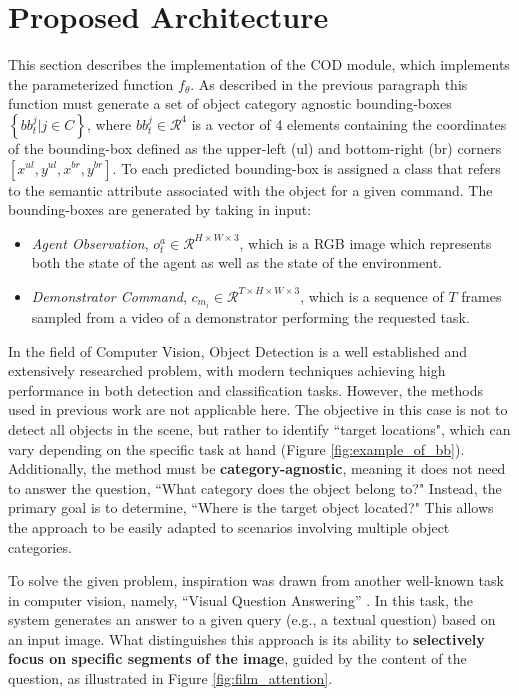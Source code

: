 \section{Proposed Architecture}
\label{sec:cod_architecture}
This section describes the implementation of the COD module, which implements the parameterized function $f_{\theta}$. 
\newline 
As described in the previous paragraph this function must generate a set of object category agnostic bounding-boxes $\left\{ bb^{j}_{t} | j \in C \right\}$, where $ bb^{j}_{t}\in \mathcal{R}^{4}$ is a vector of 4 elements containing the coordinates of the bounding-box defined as the upper-left (ul) and bottom-right (br) corners $\left[x^{ul}, y^{ul}, x^{br}, y^{br}\right]$. To each predicted bounding-box is assigned a class that refers to the semantic attribute associated with the object for a given command. 
The bounding-boxes are generated by taking in input:
\begin{itemize}
    \item \textit{Agent Observation},  $o^{a}_{t} \in \mathcal{R}^{H \times W \times 3}$, which is a RGB image which represents both the state of the agent as well as the state of the environment.
    \item \textit{Demonstrator Command}, $c_{m_{i}} \in \mathcal{R}^{T \times H \times W \times 3}$, which is a sequence of $T$ frames sampled from a video of a demonstrator performing the requested task.
\end{itemize}

In the field of Computer Vision, Object Detection is a well established and extensively researched problem, with modern techniques achieving high performance in both detection and classification tasks. However, the methods used in previous work \cite{jiang2023vima, zhu2023viola} are not applicable here. The objective in this case is not to detect all objects in the scene, but rather to identify ``target locations", which can vary depending on the specific task at hand (Figure \ref{fig:example_of_bb}). Additionally, the method must be \textbf{category-agnostic}, meaning it does not need to answer the question, ``What category does the object belong to?" Instead, the primary goal is to determine, ``Where is the target object located?" This allows the approach to be easily adapted to scenarios involving multiple object categories.


To solve the given problem, inspiration was drawn from another well-known task in computer vision, namely, ``Visual Question Answering'' \cite{perez2018film}. In this task, the system generates an answer to a given query (e.g., a textual question) based on an input image. What distinguishes this approach is its ability to \textbf{selectively focus on specific segments of the image}, guided by the content of the question, as illustrated in Figure \ref{fig:film_attention}.


